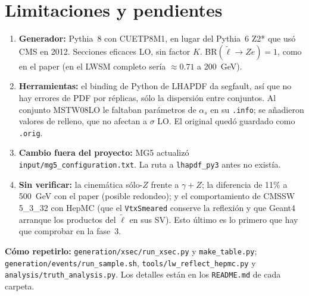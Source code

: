 \documentclass[11pt,a4paper]{article}
\newcommand{\lt}{\tilde{\ell}}
\begin{document}
\section{Limitaciones y pendientes}
\begin{enumerate}
\item \textbf{Generador:} Pythia~8 con CUETP8M1, en lugar del Pythia~6 Z2* que usó CMS en 2012. Secciones eficaces LO, sin factor $K$. BR$(\lt\to Ze)=1$, como en el paper (en el LWSM completo sería $\approx0.71$ a 200~GeV).
\item \textbf{Herramientas:} el binding de Python de LHAPDF da segfault, así que no hay errores de PDF por réplicas, sólo la dispersión entre conjuntos. Al conjunto MSTW08LO le faltaban parámetros de $\alpha_s$ en su \texttt{.info}; se añadieron valores de relleno, que no afectan a $\sigma$ LO. El original quedó guardado como \texttt{.orig}.
\item \textbf{Cambio fuera del proyecto:} MG5 actualizó \texttt{input/mg5\_configuration.txt}. La ruta a \texttt{lhapdf\_py3} antes no existía.
\item \textbf{Sin verificar:} la cinemática sólo-$Z$ frente a $\gamma+Z$; la diferencia de 11\% a 500~GeV con el paper (posible redondeo); y el comportamiento de CMSSW 5\_3\_32 con HepMC (que el \texttt{VtxSmeared} conserve la reflexión y que Geant4 arranque los productos del $\lt$ en sus SV). Esto último es lo primero que hay que comprobar en la fase~3.
\end{enumerate}

\vspace{4pt}
\noindent\textbf{Cómo repetirlo:} \texttt{generation/xsec/run\_xsec.py} y \texttt{make\_table.py}; \texttt{generation/events/run\_sample.sh}, \texttt{tools/lw\_reflect\_hepmc.py} y \texttt{analysis/truth\_analysis.py}. Los detalles están en los \texttt{README.md} de cada carpeta.
\end{document}
